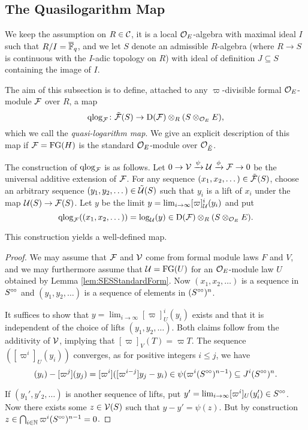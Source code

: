 \documentclass[../main.tex]{subfiles}
\begin{document}

\subsection{The Quasilogarithm Map} %
\label{sub:The Quasilogarithm map}
We keep the assumption on $R \in \mathcal{C}$, it is a local ${\mathcal{O}_E}$-algebra with maximal
ideal $I$ such that $R/I = {\overline {\mathbb{F}}_q}$, and we let
$S$ denote an admissible $R$-algebra (where $R \to S$ is continuous with
the $I$-adic topology on $R$) with ideal of definition $J \subseteq S$ containing
the image of $I$. 

The aim of this subsection is to define, attached to any $\varpi$-divisible formal
${\mathcal{O}_E}$-module $\mathcal{F}$ over $R$, a map
\begin{equation*}
  \mathrm{qlog}_{\mathcal{F}}\colon \tilde {\mathcal{F}}(S) \to \mathrm{D}(\mathcal{F}) \otimes_R (S \otimes_{\mathcal{O}_E} E),
\end{equation*}
which we call the \emph{quasi-logarithm map}.
We give an explicit description of this map if $\mathcal{F} = \textnormal{FG}(H)$ is the standard
$\mathcal{O}_E$-module over $\mathcal{O}_{\breve E}$. 

The construction of $\mathrm{qlog}_{\mathcal{F}}$ is as follows.  
Let $0 \to \mathcal{V} \xrightarrow{\psi} \mathcal{U} \xrightarrow{\phi} \mathcal{F} \to 0$ be the universal additive
extension of $\mathcal{F}$. For any sequence $(x_1, x_2, \dots) \in \tilde {\mathcal{F}}(S)$, choose an arbitrary sequence $(y_1, y_2, \dots) \in
\tilde {\mathcal{U}}(S)$ such that $y_i$ is a lift of $x_i$ under the map $\mathcal{U}(S) \to \mathcal{F}(S)$. 
Let $y$ be the limit $y = \lim_{i \to \infty} [\varpi]_{\mathcal{U}}^i(y_i)$ and put 
$$\mathrm{qlog}_{\mathcal{F}}((x_1, x_2, \dots)) = \log_{\mathcal{U}}(y) \in \mathrm{D}(\mathcal{F}) \otimes_R(S \otimes_{\mathcal{O}_E} E).$$ 

\begin{prop}
  This construction yields a well-defined map. 
\begin{proof}
  We may assume that $\mathcal{F}$ and $\mathcal{V}$ come from formal module laws $F$ and 
  $V$, and we may furthermore assume that $\mathcal{U} = \textnormal{FG}(U)$ 
  for an $\mathcal{O}_E$-module law $U$ obtained by Lemma \ref{lem:SESStandardForm}. Now
  $(x_1, x_2, \dots)$ is a sequence in $S^{\circ \hspace{-0.5pt} \circ}$ and $(y_1, y_2, \dots)$ is a
  sequence of elements in $(S^{\circ \hspace{-0.5pt} \circ})^n$.

  It suffices to show that $y = \lim_{i\to \infty} [\varpi]^i_U(y_i)$ exists and 
  that it is independent of the choice of lifts $(y_1, y_2, \dots)$. 
  Both claims follow from the additivity of $\mathcal{V}$, implying that 
  $[\varpi]_{V}(T) = \varpi T$. The sequence 
  $([\varpi^i]_{U}(y_i))$ converges, as for positive integers $i\leq j$, we have 
  \begin{equation*}
    [\varpi^i](y_i) - [\varpi^j](y_j) = [\varpi^i]([\varpi^{i-j}]y_j - y_i)
    \in \psi(\varpi^i (S^\cici)^{n-1}) \subseteq J^i (S^\cici)^{n}. 
  \end{equation*}

  If $(y_1', y'_2, \dots)$ is another sequence of lifts, put
  $y' = \lim_{i \to \infty} [\varpi^i]_U (y_i') \in S^{\circ \hspace{-0.5pt} \circ}$. Now there exists some
  $z \in \mathcal{V}(S)$ such that 
  $y - y' = \psi(z)$. But by construction
  $z \in \bigcap_{i \in \mathbb{N}} \varpi^i(S^{{\circ \hspace{-0.5pt} \circ}})^{n-1} = 0$.
\end{proof}
\end{prop}
\end{document}

